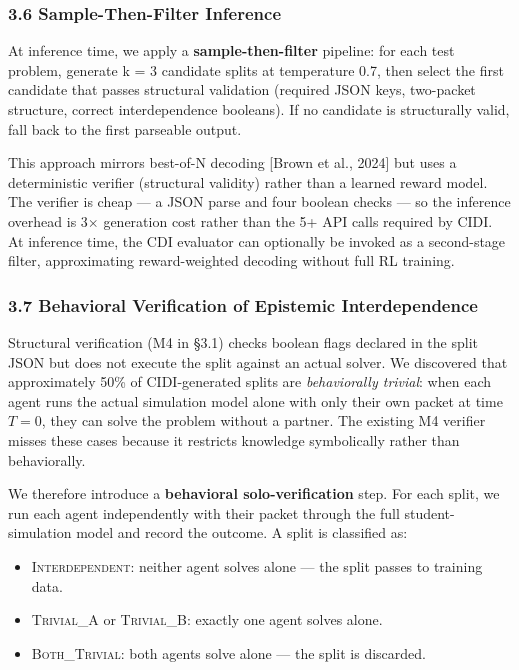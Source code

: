 \documentclass[
  11pt,
]{article}
\providecommand{\tightlist}{%
  \setlength{\itemsep}{0pt}\setlength{\parskip}{0pt}}
\begin{document}
\subsubsection{3.6 Sample-Then-Filter
Inference}\label{sample-then-filter-inference}

At inference time, we apply a \textbf{sample-then-filter} pipeline: for
each test problem, generate k = 3 candidate splits at temperature 0.7,
then select the first candidate that passes structural validation
(required JSON keys, two-packet structure, correct interdependence
booleans). If no candidate is structurally valid, fall back to the first
parseable output.

This approach mirrors best-of-N decoding [Brown et al., 2024]
but uses a deterministic verifier (structural validity) rather than a
learned reward model. The verifier is cheap --- a JSON parse and four
boolean checks --- so the inference overhead is 3$\times$ generation cost
rather than the 5+ API calls required by CIDI. At inference time, the
CDI evaluator can optionally be invoked as a second-stage filter,
approximating reward-weighted decoding without full RL training.

\subsubsection{3.7 Behavioral Verification of Epistemic
Interdependence}\label{behavioral-verification}

Structural verification (M4 in §3.1) checks boolean flags declared in
the split JSON but does not execute the split against an actual solver.
We discovered that approximately 50\% of CIDI-generated splits are
\emph{behaviorally trivial}: when each agent runs the actual simulation
model alone with only their own packet at time $T=0$, they can solve the
problem without a partner. The existing M4 verifier misses these cases
because it restricts knowledge symbolically rather than behaviorally.

We therefore introduce a \textbf{behavioral solo-verification} step.
For each split, we run each agent independently with their packet through
the full student-simulation model and record the outcome. A split is
classified as:
\begin{itemize}
\tightlist
\item \textsc{Interdependent}: neither agent solves alone --- the split passes to training data.
\item \textsc{Trivial\_A} or \textsc{Trivial\_B}: exactly one agent solves alone.
\item \textsc{Both\_Trivial}: both agents solve alone --- the split is discarded.
\end{itemize}
\end{document}
